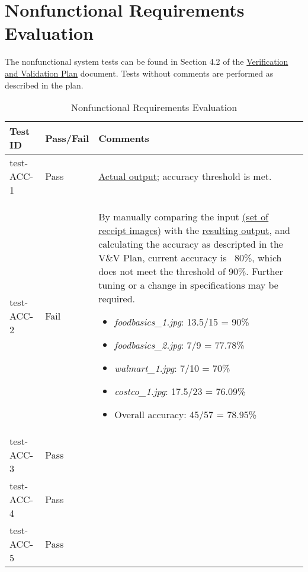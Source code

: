 \documentclass[12pt, titlepage]{article}
\begin{document}
\section{Nonfunctional Requirements Evaluation}

The nonfunctional system tests can be found in Section 4.2 of the
\href{https://github.com/PlutosCapstone/Plutos/blob/main/docs/VnVPlan/VnVPlan.pdf}{Verification
and Validation Plan} document. Tests without comments are performed as described
in the plan.


\begin{longtable}{>{\centering\arraybackslash}p{} >{\centering\arraybackslash}p{} >{\centering\arraybackslash}p{}}
  \caption{Nonfunctional Requirements Evaluation}\\
    \toprule
    \textbf{Test ID} & \textbf{Pass/Fail} & \textbf{Comments} \\
    \midrule
    test-ACC-1 & Pass &
    \href{https://github.com/PlutosCapstone/Plutos/tree/main/src/server/tests/imageProcessing/data/categorization/receipt_items_output.csv}{Actual
    output}; accuracy threshold is met. \\
    test-ACC-2 & Fail & By manually comparing the input
    \href{https://github.com/PlutosCapstone/Plutos/tree/main/src/server/tests/imageProcessing/data/parsing/input}{
    (set of receipt images)} with the
    \href{https://github.com/PlutosCapstone/Plutos/tree/main/src/server/tests/imageProcessing/data/parsing/input}{resulting
    output}, and calculating the accuracy as descripted in the V\&V Plan,
    current accuracy is ~80\%, which does not meet the threshold of 90\%.
    Further tuning or a change in specifications may be required.
    \begin{itemize}
      \item \textit{foodbasics\_1.jpg}: 13.5/15 = 90\%
      \item \textit{foodbasics\_2.jpg}: 7/9 = 77.78\%
      \item \textit{walmart\_1.jpg}: 7/10 = 70\%
      \item \textit{costco\_1.jpg}: 17.5/23 = 76.09\%
      \item Overall accuracy: 45/57 = 78.95\%
    \end{itemize}\\
    test-ACC-3 & Pass &  \\
    test-ACC-4 & Pass &  \\
    test-ACC-5 & Pass &  \\
    \midrule

\end{longtable}
\end{document}
